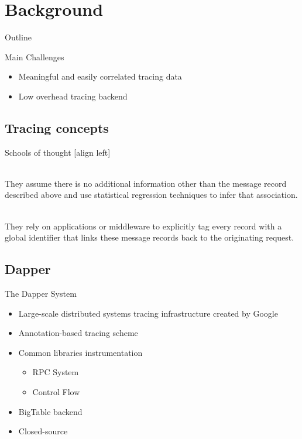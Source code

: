 \section{Background}

\begin{frame}[t]{Outline}
\setcounter{tocdepth}{1}
\tableofcontents[currentsection]
\end{frame}

\begin{frame}{Main Challenges}
\begin{itemize}  \itemsep50pt
\item Meaningful and easily correlated tracing data
\item Low overhead tracing backend
\end{itemize}
\end{frame}

\subsection{Tracing concepts}

\begin{frame}{Schools of thought}
[align left]
\begin{description} \itemsep10pt

\item[black-box schemes] \hfill \\
They assume there is no additional information other than the message record
described above and use statistical regression techniques to infer that
association.

\item[annotation-based schemes] \hfill \\
They rely on applications or middleware to explicitly tag every record with a
global identifier that links these message records back to the originating
request.

\end{description}
\end{frame}

\subsection{Dapper}

\begin{frame}{The Dapper System }

\begin{itemize}
\item Large-scale distributed systems tracing infrastructure created by Google
\item Annotation-based tracing scheme
\item Common libraries instrumentation 
    \begin{itemize}
    \item RPC System
    \item Control Flow
    \end{itemize}
\item BigTable backend
\item Closed-source
\end{itemize}
\end{frame}

